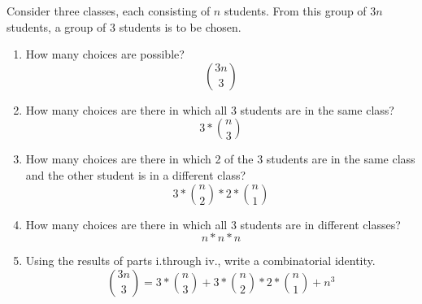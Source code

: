 \item Consider three classes, each consisting of $n$ students. From this group of $3n$ students, a group of 3 students is to be chosen.
\begin{enumerate}
    \item How many choices are possible?
    \[ \binom{3n}{3} \]
    \item How many choices are there in which all 3 students are in the same class?
    \[ 3 * \binom{n}{3} \]
    \item How many choices are there in which 2 of the 3 students are in the same class and the other student is in a different class?
    \[ 3 * \binom{n}{2} * 2 * \binom{n}{1} \]
    \item How many choices are there in which all 3 students are in different classes?
    \[ n * n * n \]
    \item Using the results of parts i.\@ through iv.\@, write a combinatorial identity.
    \[ \binom{3n}{3} = 3 * \binom{n}{3} + 3 * \binom{n}{2} * 2 * \binom{n}{1} + n^3 \]
\end{enumerate}
